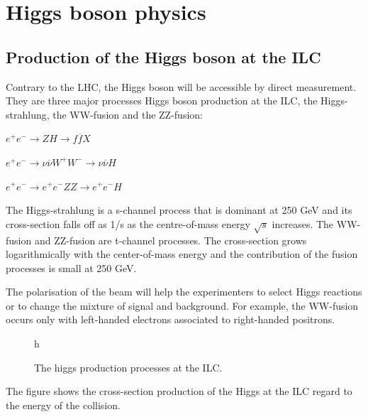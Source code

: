   \section{Higgs boson physics}

  \subsection{Production of the Higgs boson at the ILC}

  Contrary to the LHC, the Higgs boson will be accessible by direct measurement. 
  They are three major processes Higgs boson production at the ILC, the Higgs-strahlung, the WW-fusion and the ZZ-fusion:

  \begin{description}
    \centering
    \item[Higgs-strahlung:] $e^+e^- \rightarrow ZH \rightarrow f\overline{f}X$
    \item[WW-fusion:] $e^+e^- \rightarrow \nu \overline{\nu} W^+W^- \rightarrow \nu \overline{\nu} H$
    \item[ZZ-fusion:] $e^+e^- \rightarrow e^+e^- ZZ \rightarrow e^+e^- H$
  \end{description}

  The Higgs-strahlung is a s-channel process that is dominant at 250 GeV and its cross-section falls off as 1/s as the centre-of-mass energy $\sqrt{s}$ increases.
  The WW-fusion and ZZ-fusion are t-channel processes. 
  The cross-section grows logarithmically with the center-of-mass energy and the contribution of the fusion processes is small at 250 GeV.

  The polarisation of the beam will help the experimenters to select Higgs reactions or to change the mixture of signal and background.
  For example, the WW-fusion occurs only with left-handed electrons associated to right-handed positrons. 


  \begin{figure}{h}
    \centering
    \caption{The higgs production processes at the ILC.}
    \label{fig:higgsProd}
  \end{figure}

  The figure  shows the cross-section production of the Higgs at the ILC regard to the energy of the collision.
  
